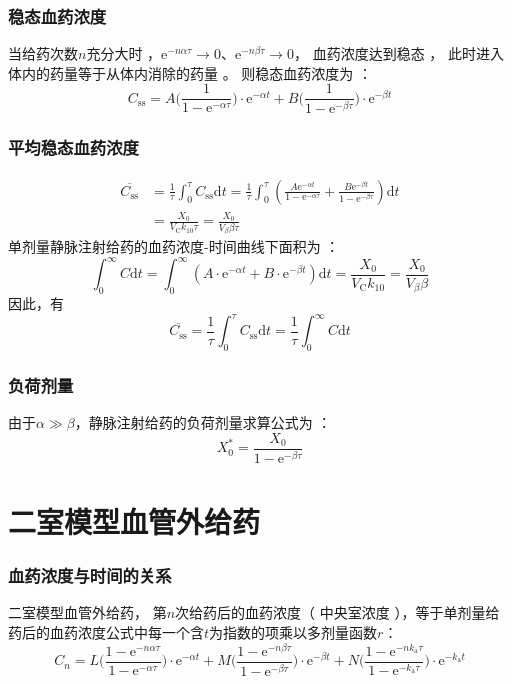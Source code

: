 \documentclass[dvipsnames, svgnames, x11names]{beamer}
\begin{document}
\begin{frame}
	\frametitle{稳态血药浓度}
	当给药次数$n$充分大时 ，$\mathrm{e}^{-n\alpha\tau} \to 0$、$\mathrm{e}^{-n\beta \tau} \to 0$， 血药浓度达到稳态 ， 此时进入体内的药量等于从体内消除的药量 。 则稳态血药浓度为 ：
	\[
		C_\mathrm{ss}=A\Big(\frac{1}{1-\mathrm{e}^{-\alpha\tau}}\Big)\cdot\mathrm{e}^{-\alpha t}+B\Big(\frac{1}{1-\mathrm{e}^{-\beta\tau}}\Big)\cdot\mathrm{e}^{-\beta t}
	\]
\end{frame}


\begin{frame}
	\frametitle{平均稳态血药浓度}
	\[
		\begin{aligned}
			\overline{C_\mathrm{ss}}& =\frac{1}{\tau}\int_{0}^{\tau}C_{\mathrm{ss}}\mathrm{d}t=\frac{1}{\tau}\int_{0}^{\tau}\left(\frac{A\mathrm{e}^{-\alpha t}}{1-\mathrm{e}^{-\alpha\tau}}+\frac{B\mathrm{e}^{-\beta t}}{1-\mathrm{e}^{-\beta\tau}}\right)\mathrm{d}t  \\
			&=\frac{X_{0}}{V_{\mathrm{C}}k_{{10}}\tau}=\frac{X_{{0}}}{V_{{\beta}}\beta\tau}
		\end{aligned}
	\]
	单剂量静脉注射给药的血药浓度-时间曲线下面积为 ：
	\[
		\int_{0}^{\infty}C\mathrm{d}t=\int_{0}^{\infty}(A\cdot\mathrm{e}^{-\alpha t}+B\cdot\mathrm{e}^{-\beta t})\mathrm{d}t=\frac{X_{0}}{V_\mathrm{C}k_{10}}=\frac{X_{0}}{V_{\beta}\beta}
	\]
	因此，有
	\[
		\overline{C_\mathrm{ss}} = \frac{1}{\tau}\int_{0}^{\tau}C_{\mathrm{ss}}\mathrm{d}t = \frac{1}{\tau}\int_{0}^{\infty}C\mathrm{d}t
	\]
\end{frame}


\begin{frame}
	\frametitle{负荷剂量}
	由于$\alpha \gg \beta$，静脉注射给药的负荷剂量求算公式为 ：
	\[
		X_0^*=\dfrac{X_0}{1-\mathrm{e}^{-\beta\tau}}
	\]
\end{frame}


\section{二室模型血管外给药}


\begin{frame}
	\frametitle{血药浓度与时间的关系}
	二室模型血管外给药， 第$n$次给药后的血药浓度（ 中央室浓度 ），等于单剂量给药后的血药浓度公式中每一个含$t$为指数的项乘以多剂量函数$r$：
	\[
		C_n=L\Big(\frac{1-\mathrm{e}^{-n\alpha\tau}}{1-\mathrm{e}^{-\alpha\tau}}\Big)\cdot\mathrm{e}^{-\alpha t}+M\Big(\frac{1-\mathrm{e}^{-n\beta\tau}}{1-\mathrm{e}^{-\beta\tau}}\Big)\cdot\mathrm{e}^{-\beta t}+N\Big(\frac{1-\mathrm{e}^{-nk_\mathrm{a}\tau}}{1-\mathrm{e}^{-k_\mathrm{a}\tau}}\Big)\cdot\mathrm{e}^{-k_\mathrm{a} t}
	\]
\end{frame}
\end{document}
